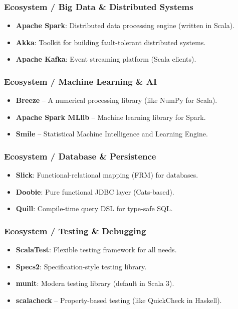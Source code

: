 \documentclass{beamer}
\begin{document}

\begin{frame}
\frametitle{Ecosystem / Big Data \& Distributed Systems }

\begin{itemize}
  \item \textbf{Apache Spark}: Distributed data processing engine (written in Scala).
  \item \textbf{Akka}: Toolkit for building fault-tolerant distributed systems.
  \item \textbf{Apache Kafka}: Event streaming platform (Scala clients).
\end{itemize}

\end{frame}


\begin{frame}
\frametitle{Ecosystem / Machine Learning \& AI }
\begin{itemize}
  \item \textbf{Breeze} – A numerical processing library (like NumPy for Scala).
  \item \textbf{Apache Spark MLlib} – Machine learning library for Spark.
  \item \textbf{Smile} – Statistical Machine Intelligence and Learning Engine.
\end{itemize}
\end{frame}


\begin{frame}
\frametitle{Ecosystem / Database \& Persistence }
\begin{itemize}
  \item \textbf{Slick}: Functional-relational mapping (FRM) for databases.
  \item \textbf{Doobie}: Pure functional JDBC layer (Cats-based).
  \item \textbf{Quill}: Compile-time query DSL for type-safe SQL.
\end{itemize}
\end{frame}


\begin{frame}
\frametitle{Ecosystem /  Testing \& Debugging }
\begin{itemize}
  \item \textbf{ScalaTest}: Flexible testing framework for all needs.
  \item \textbf{Specs2}: Specification-style testing library.
  \item \textbf{munit}: Modern testing library (default in Scala 3).
  \item \textbf{scalacheck} – Property-based testing (like QuickCheck in Haskell).
\end{itemize}
\end{frame}
\end{document}

